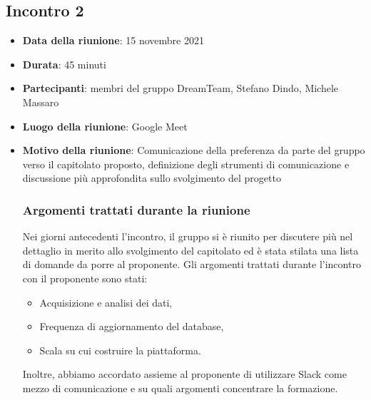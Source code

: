 \subsection{Incontro 2}
\begin{itemize}
\item \textbf{Data della riunione}: 15 novembre 2021
\item \textbf{Durata}: 45 minuti
\item \textbf{Partecipanti}: membri del gruppo DreamTeam,  Stefano Dindo,  Michele Massaro
\item \textbf{Luogo della riunione}: Google Meet
\item \textbf{Motivo della riunione}: Comunicazione della preferenza da parte del gruppo verso il capitolato proposto, definizione degli strumenti di comunicazione e discussione più approfondita sullo svolgimento del progetto
\subsubsection{Argomenti trattati durante la riunione}
Nei giorni antecedenti l’incontro, il gruppo si è riunito per discutere più nel dettaglio in merito allo svolgimento del capitolato ed è stata stilata una lista di domande da porre al proponente.  Gli argomenti trattati durante l’incontro con il proponente sono stati:
	\begin{itemize}
		\item Acquisizione e analisi dei dati,
		\item Frequenza di aggiornamento del database,
		\item Scala su cui costruire la piattaforma.
	\end{itemize}
	Inoltre, abbiamo accordato assieme al proponente di utilizzare Slack come mezzo di comunicazione e su quali argomenti concentrare la formazione.

\end{itemize} 


